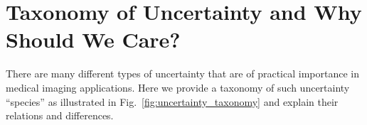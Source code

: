 

%

 \section{Taxonomy of Uncertainty and Why Should We Care?}
There are many different types of uncertainty that are of practical importance in medical imaging applications. Here we provide a taxonomy of such uncertainty ``species'' as illustrated in Fig.~\ref{fig:uncertainty_taxonomy} and explain their relations and differences. 

